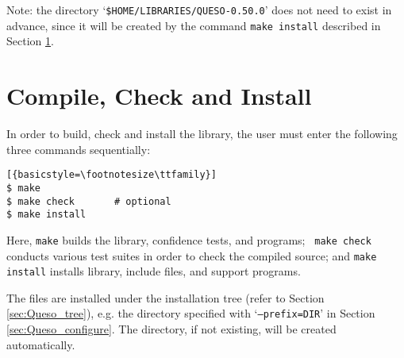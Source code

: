 Note: the directory `\verb+$HOME/LIBRARIES/QUESO-0.50.0+' does not need to exist in advance, since it will be created by the command \verb+make install+ described in Section \ref{sec:install_Queso_make}.


\section{Compile, Check and Install \Queso{}}\label{sec:install_Queso_make}
%
In order to build, check and install the library, the user must enter the following three commands sequentially:
\begin{lstlisting}[{basicstyle=\footnotesize\ttfamily}]
$ make
$ make check       # optional
$ make install 
\end{lstlisting}

Here, \verb+make+ builds the library, confidence tests, and programs;  \verb+ make check+ conducts various test suites in order to check the compiled source; and \verb+make install+ installs \Queso{} library, include files, and support programs.

The files are installed under the installation tree (refer to Section \ref{sec:Queso_tree}), e.g. the directory specified with `\texttt{--prefix=DIR}' in Section \ref{sec:Queso_configure}. The directory, if not existing, will be created automatically.%

% 
% 
% 
% 

